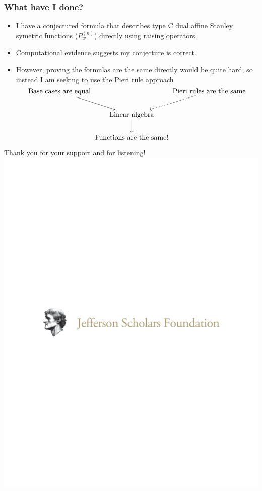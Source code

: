 \documentclass{beamer}
\begin{document}
\begin{frame}[fragile]
  \frametitle{What have I done?}
  \begin{itemize}
  \item I have a conjectured formula that describes type
    C dual affine Stanley symetric functions (\(P_w^{(n)}\)) directly
    using raising operators. \pause 
  
   \item Computational evidence suggests my conjecture is correct. \pause
  
   \item However, proving the formulas are the same directly would be quite
    hard, so instead I am seeking to use the Pieri rule approach \[
      \begin{tikzcd}[cramped, column sep=0.01em]
        \text{Base cases are equal} \ar[rd]&\, & \ar[ld, dashed] \text{Pieri rules are the same}\\
        \ &\text{Linear algebra} \ar[d] & \ \\
        \ &\text{Functions are the same!} & \
      \end{tikzcd}
    \]
  \end{itemize}
  \end{frame}
  \begin{frame}
    \begin{center}
      Thank you for your support and for listening!\\
      \includegraphics[scale=0.5]{images/jsf_horizontal_logo.pdf}
    \end{center}
  \end{frame}
\end{document}
